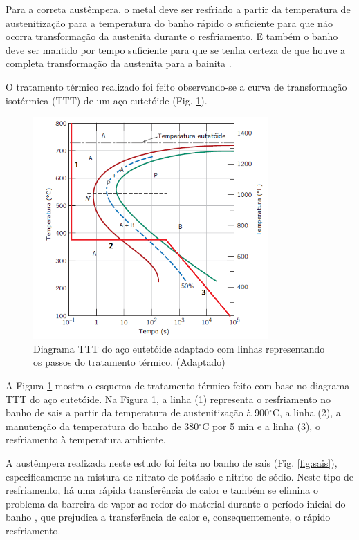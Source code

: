 \documentclass[
12pt,
openany, %
oneside, %
a4paper,			
english,			
brazil			        %
]{abntbibufjf}
\begin{document}
	Para a correta austêmpera, o metal deve ser resfriado a partir da temperatura de austenitização para a temperatura do banho rápido o suficiente para que não ocorra transformação da austenita durante o resfriamento. E também o banho deve ser mantido por tempo suficiente para que se tenha certeza de que houve a completa transformação da austenita para a bainita \cite{asm1991heat}.
	
	O tratamento térmico realizado foi feito observando-se a curva de transformação isotérmica (TTT) de um aço eutetóide (Fig. \ref{fig:austempera}).
	
	\begin{figure}[H]
		\centering
		\includegraphics[width=0.8\textwidth]{austempera}
		\caption{Diagrama TTT do aço eutetóide adaptado com linhas representando os passos do tratamento térmico. \cite{callister2011materials} (Adaptado)}
		\label{fig:austempera}
	\end{figure}
	
	A Figura \ref{fig:austempera} mostra o esquema de tratamento térmico feito com base no diagrama TTT do aço eutetóide. Na Figura \ref{fig:austempera}, a linha (1) representa o resfriamento no banho de sais a partir da temperatura de austenitização à 900$^{\circ}$C, a linha (2), a manutenção da temperatura do banho de 380$^{\circ}$C por 5 min e a linha (3), o resfriamento à temperatura ambiente.
	
	A austêmpera realizada neste estudo foi feita no banho de sais (Fig. \ref{fig:sais}), especificamente na mistura de nitrato de potássio e nitrito de sódio. Neste tipo de resfriamento, há uma rápida transferência de calor e também se elimina o problema da barreira de vapor ao redor do material durante o período inicial do banho \cite{asm1991heat}, que prejudica a transferência de calor e, consequentemente, o rápido resfriamento.
	
\end{document}
